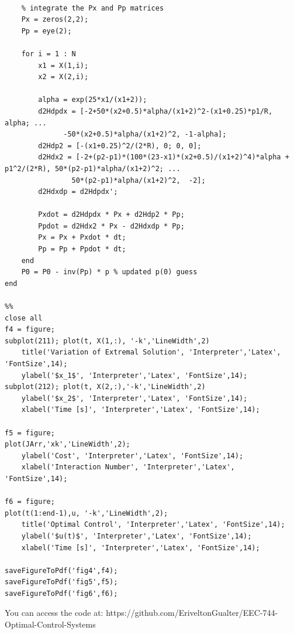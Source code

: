 \documentclass{article}
\begin{document}
\begin{lstlisting}
    
    % integrate the Px and Pp matrices
    Px = zeros(2,2);
    Pp = eye(2);
        
    for i = 1 : N
        x1 = X(1,i);
        x2 = X(2,i);
        
        alpha = exp(25*x1/(x1+2));
        d2Hdpdx = [-2+50*(x2+0.5)*alpha/(x1+2)^2-(x1+0.25)*p1/R, alpha; ...
              -50*(x2+0.5)*alpha/(x1+2)^2, -1-alpha];
        d2Hdp2 = [-(x1+0.25)^2/(2*R), 0; 0, 0];
        d2Hdx2 = [-2+(p2-p1)*(100*(23-x1)*(x2+0.5)/(x1+2)^4)*alpha + p1^2/(2*R), 50*(p2-p1)*alpha/(x1+2)^2; ...
                50*(p2-p1)*alpha/(x1+2)^2,  -2];
        d2Hdxdp = d2Hdpdx';
    
        Pxdot = d2Hdpdx * Px + d2Hdp2 * Pp;
        Ppdot = d2Hdx2 * Px - d2Hdxdp * Pp;
        Px = Px + Pxdot * dt;
        Pp = Pp + Ppdot * dt;
    end
    P0 = P0 - inv(Pp) * p % updated p(0) guess
end

%%
close all
f4 = figure;
subplot(211); plot(t, X(1,:), '-k','LineWidth',2)
    title('Variation of Extremal Solution', 'Interpreter','Latex', 'FontSize',14);
    ylabel('$x_1$', 'Interpreter','Latex', 'FontSize',14);
subplot(212); plot(t, X(2,:),'-k','LineWidth',2)
    ylabel('$x_2$', 'Interpreter','Latex', 'FontSize',14);
    xlabel('Time [s]', 'Interpreter','Latex', 'FontSize',14);

f5 = figure;
plot(JArr,'xk','LineWidth',2);
    ylabel('Cost', 'Interpreter','Latex', 'FontSize',14);
    xlabel('Interaction Number', 'Interpreter','Latex', 'FontSize',14);

f6 = figure;
plot(t(1:end-1),u, '-k','LineWidth',2);
    title('Optimal Control', 'Interpreter','Latex', 'FontSize',14);
    ylabel('$u(t)$', 'Interpreter','Latex', 'FontSize',14);
    xlabel('Time [s]', 'Interpreter','Latex', 'FontSize',14);
    
saveFigureToPdf('fig4',f4);
saveFigureToPdf('fig5',f5);
saveFigureToPdf('fig6',f6);
\end{lstlisting}

You can access the code at: https://github.com/EriveltonGualter/EEC-744-Optimal-Control-Systems
\end{document}
